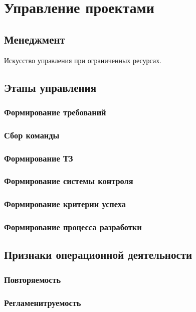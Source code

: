 \chapter{Управление проектами}

\section{Менеджмент}
Искусство управления при ограниченных ресурсах.

\section{Этапы управления}

\subsection{Формирование требований}
\subsection{Сбор команды}
\subsection{Формирование ТЗ}
\subsection{Формирование системы контроля}
\subsection{Формирование критерии успеха}
\subsection{Формирование процесса разработки}

\section{Признаки операционной деятельности}

\subsection{Повторяемость}
\subsection{Регламенитруемость}

